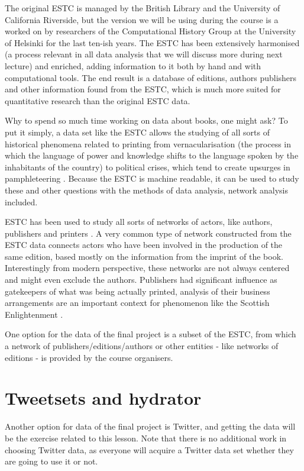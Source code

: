\documentclass[
]{book}
\begin{document}
The original ESTC is managed by the British Library and the University of California Riverside, but the version we will be using during the course is a worked on by researchers of the Computational History Group at the University of Helsinki for the last ten-ish years. The ESTC has been extensively harmonised (a process relevant in all data analysis that we will discuss more during next lecture) and enriched, adding information to it both by hand and with computational tools. The end result is a database of editions, authors publishers and other information found from the ESTC, which is much more suited for quantitative research than the original ESTC data.

Why to spend so much time working on data about books, one might ask? To put it simply, a data set like the ESTC allows the studying of all sorts of historical phenomena related to printing from vernacularisation (the process in which the language of power and knowledge shifts to the language spoken by the inhabitants of the country) to political crises, which tend to create upsurges in pamphleteering \citep{Lahti2019}. Because the ESTC is machine readable, it can be used to study these and other questions with the methods of data analysis, network analysis included.

ESTC has been used to study all sorts of networks of actors, like authors, publishers and printers \citep{Hill2019}. A very common type of network constructed from the ESTC data connects actors who have been involved in the production of the same edition, based mostly on the information from the imprint of the book. Interestingly from modern perspective, these networks are not always centered and might even exclude the authors. Publishers had significant influence as gatekeepers of what was being actually printed, analysis of their business arrangements are an important context for phenomenon like the Scottish Enlightenment \citep{Sher2006}.

One option for the data of the final project is a subset of the ESTC, from which a network of publishers/editions/authors or other entities - like networks of editions - is provided by the course organisers.

\hypertarget{tweetsets-and-hydrator}{%
\section{Tweetsets and hydrator}\label{tweetsets-and-hydrator}}

Another option for data of the final project is Twitter, and getting the data will be the exercise related to this lesson. Note that there is no additional work in choosing Twitter data, as everyone will acquire a Twitter data set whether they are going to use it or not.
\end{document}
